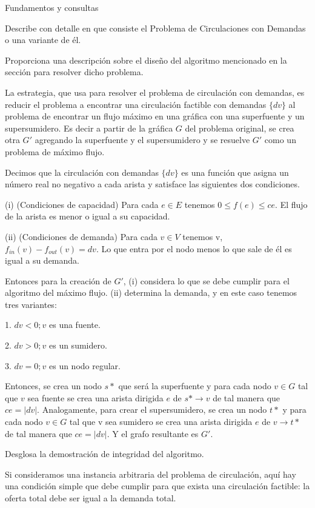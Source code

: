 \documentclass{article}
\begin{document}
\begin{section} {Fundamentos y consultas}
\begin{subsection}{Describe con detalle en que consiste el Problema de Circulaciones con Demandas o una variante de él.}
	\end{subsection}
	
	\begin{subsection}{Proporciona una descripción sobre el diseño del algoritmo mencionado en la sección para resolver dicho problema.}
		
		La estrategia, que usa para resolver el problema de circulación con demandas, es reducir el problema a encontrar una circulación factible con demandas $\{dv\}$ al problema de encontrar un flujo máximo en una gráfica con una superfuente y un supersumidero. Es decir a partir de la gráfica $G$ del problema original, se crea otra $G'$ agregando la superfuente y el supersumidero y se resuelve $G'$ como un problema de máximo flujo. 
		
		Decimos que la circulación con demandas $\{dv\}$ es una función que asigna un número real no negativo a cada arista y satisface las siguientes dos condiciones.
		
		(i) (Condiciones de capacidad) Para cada $e\in E$ tenemos $0 \leq f(e) \leq ce$. El flujo de la arista es menor o igual a su capacidad.
		
		(ii) (Condiciones de demanda) Para cada $ v \in V $ tenemos v, $f_{in}(v) - f_{out}(v) = dv$. Lo que entra por el nodo menos lo que sale de él es igual a su demanda.
		
		Entonces para la creación de $G'$, (i) considera lo que se debe cumplir para el algoritmo del máximo flujo. (ii) determina la demanda, y en este caso tenemos tres variantes:
		
		1. $dv < 0; v$ es una fuente.
		
		2. $dv > 0; v$ es un sumidero.
		
		3. $dv = 0; v$ es un nodo regular.
		
		Entonces, se crea un nodo $s*$ que será la superfuente y para cada nodo $v \in G$ tal que $v$ sea fuente se crea una arista dirigida $e$ de $s* \rightarrow v$ de tal manera que $ce = |dv|$. Analogamente, para crear el supersumidero, se crea un nodo $t*$ y para cada nodo $v \in G$ tal que v sea sumidero se crea una arista dirigida $e$ de $v \rightarrow t*$ de tal manera que $ce = |dv|$. Y el grafo resultante es $G'$.
		
	\end{subsection}
	
	\begin{subsection}{Desglosa la demostración de integridad del algoritmo.}
		
		Si consideramos una instancia arbitraria del problema de circulación, aquí hay una condición simple que debe cumplir para que exista una circulación factible: la oferta total debe ser igual a la demanda total.
		

\end{subsection}
\end{section}
\end{document}
